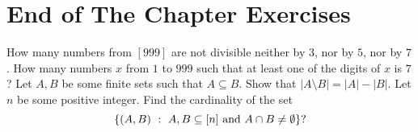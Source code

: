 \section*{End of The Chapter Exercises}
\begin{exercises}
  \exercise How many numbers from $[999]$ are not divisible neither by $3$,
    nor by $5$, nor by $7$.
  \exercise How many numbers $x$ from $1$ to $999$ such that at least one
    of the digits of $x$ is $7$?
  \exercise Let $A, B$ be some finite sets such that $A \subseteq B$.
    Show that $|A \setminus B| = |A| - |B|$.
  \exercise Let $n$ be some positive integer.
    Find the cardinality of the set
    \[
      \set[{A, B \subseteq [n] \text{ and } A \cap B \neq \emptyset}]{(A, B)}?
    \]
\end{exercises}

